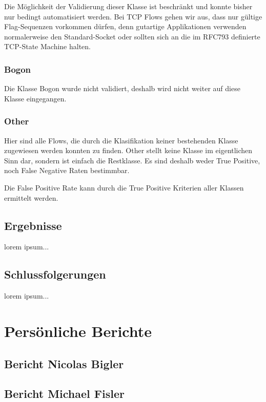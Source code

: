 \documentclass[a4paper]{scrartcl}
\begin{document}
Die  Möglichkeit der Validierung dieser Klasse ist beschränkt und konnte bisher nur bedingt automatisiert werden. Bei TCP Flows gehen wir aus, dass nur gültige Flag-Sequenzen vorkommen dürfen, denn gutartige Applikationen verwenden normalerweise den Standard-Socket oder sollten sich an die im RFC793 \cite{rfc_tcp} definierte TCP-State Machine halten.

\subsubsection{Bogon}
Die Klasse Bogon wurde nicht validiert, deshalb wird nicht weiter auf diese Klasse eingegangen.

\subsubsection{Other}
Hier sind alle Flows, die durch die Klasifikation keiner bestehenden Klasse zugewiesen werden konnten zu finden. Other stellt keine Klasse im eigentlichen Sinn dar, sondern ist einfach die Restklasse. Es sind deshalb weder True Positive, noch False Negative Raten bestimmbar.

Die False Positive Rate kann durch die True Positive Kriterien aller Klassen ermittelt werden.


\subsection{Ergebnisse}
lorem ipsum...
\subsection{Schlussfolgerungen}
lorem ipsum...

\section{Persönliche Berichte}
\subsection{Bericht Nicolas Bigler}
\subsection{Bericht Michael Fisler}

\end{document}
